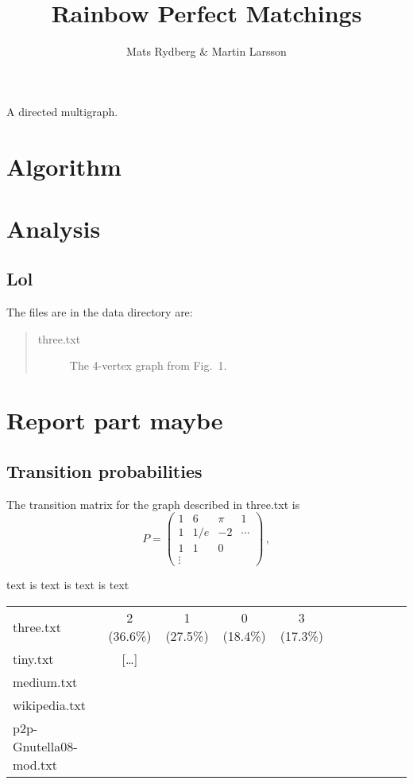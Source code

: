 \documentclass{tufte-handout}
\title{\sf Rainbow Perfect Matchings}
\author{Mats Rydberg \& Martin Larsson}
\begin{document}
\maketitle

\begin{marginfigure}
\caption{A directed multigraph.}
\end{marginfigure}

\section{Algorithm}

\section{Analysis}

\subsection{Lol}

The files are in the data directory are:
\begin{quotation}
\begin{description}
\item[three.txt] The 4-vertex graph from Fig.~1.
\end{description}
\end{quotation}

\section{Report part maybe}

\subsection{Transition probabilities}

The transition matrix for the graph described in three.txt
is
\begin{equation*}
P = 
\left(
\begin{array}{cccc}
1 & 6 & \pi & 1\\
1 & 1/e & -2  & \cdots\\
1 & 1 & 0 \\
\vdots
\end{array}
\right)\,,
\end{equation*}

\noindent text is text is text is text

\medskip
\begin{fullwidth}
\small
\begin{tabular}{lcccccccccc}
three.txt & 2 (36.6\%) & 1 (27.5\%) & 0 (18.4\%) & 3 (17.3\%) \\
tiny.txt & [\ldots] &\\
medium.txt &\\
wikipedia.txt & \\
p2p-Gnutella08-mod.txt &
\end{tabular}
\end{fullwidth}
\end{document}
